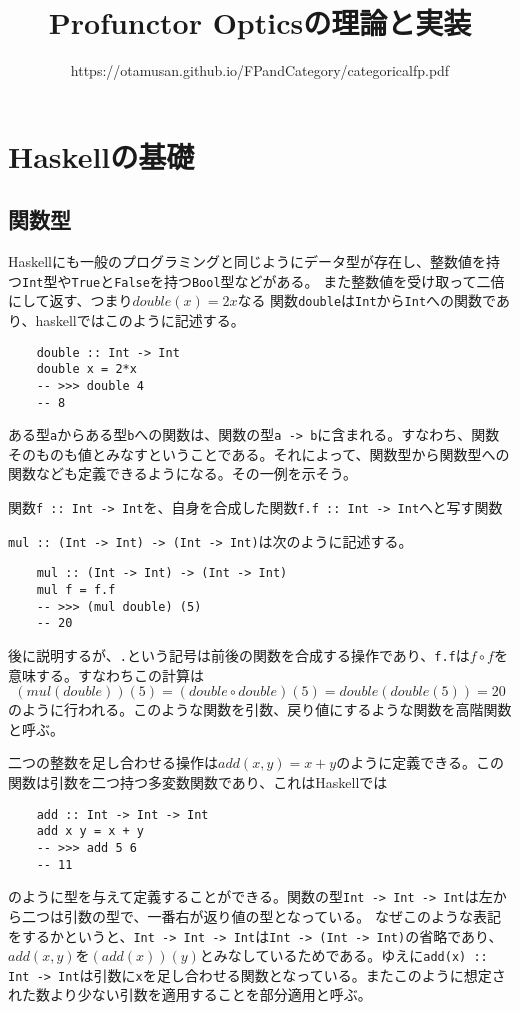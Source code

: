 \documentclass[uplatex,dvipdfmx]{jsarticle}
\newcommand{\pr}[1]{\colorbox[rgb]{0.9,0.9,0.9}{\lstinline{#1}}}
\newcommand{\functype}[2]{\pr{#1 -> #2}}
\newcommand{\fpmor}[3]{\pr{#1 :: #2 -> #3}}
\begin{document}
  \title{Profunctor Opticsの理論と実装}
  \author{https://otamusan.github.io/FPandCategory/categoricalfp.pdf}
  \maketitle
	\tableofcontents
  \pagebreak
  \section{Haskellの基礎}
  \subsection{関数型}
  Haskellにも一般のプログラミングと同じようにデータ型が存在し、整数値を持つ\pr{Int}型や\pr{True}と\pr{False}を持つ\pr{Bool}型などがある。
  また整数値を受け取って二倍にして返す、つまり$double(x)=2x$なる
  関数\pr{double}は\pr{Int}から\pr{Int}への関数であり、haskellではこのように記述する。
  \begin{lstlisting}
    double :: Int -> Int
    double x = 2*x
    -- >>> double 4
    -- 8
  \end{lstlisting}
  ある型\pr{a}からある型\pr{b}への関数は、関数の型\functype{a}{b}に含まれる。すなわち、関数そのものも値とみなすということである。それによって、関数型から関数型への関数なども定義できるようになる。その一例を示そう。

  関数\fpmor{f}{Int}{Int}を、自身を合成した関数\fpmor{f.f}{Int}{Int}へと写す関数
  
  \fpmor{mul}{(Int -> Int)}{(Int -> Int)}は次のように記述する。
  \begin{lstlisting}
    mul :: (Int -> Int) -> (Int -> Int)
    mul f = f.f
    -- >>> (mul double) (5)
    -- 20
  \end{lstlisting}
  後に説明するが、\pr{.}という記号は前後の関数を合成する操作であり、\pr{f.f}は$f\circ f$を意味する。すなわちこの計算は
  \[(mul(double))(5)=(double \circ double)(5)=double(double(5))=20\]のように行われる。このような関数を引数、戻り値にするような関数を高階関数と呼ぶ。
  
  二つの整数を足し合わせる操作は$add(x,y)=x+y$のように定義できる。この関数は引数を二つ持つ多変数関数であり、これはHaskellでは
  \begin{lstlisting}
    add :: Int -> Int -> Int
    add x y = x + y
    -- >>> add 5 6
    -- 11
  \end{lstlisting}
  のように型を与えて定義することができる。関数の型\pr{Int -> Int -> Int}は左から二つは引数の型で、一番右が返り値の型となっている。
  なぜこのような表記をするかというと、\pr{Int -> Int -> Int}は\pr{Int -> (Int -> Int)}の省略であり、$add(x,y)$を$(add(x))(y)$とみなしているためである。ゆえに\fpmor{add(x)}{Int}{Int}は引数に\pr{x}を足し合わせる関数となっている。またこのように想定された数より少ない引数を適用することを部分適用と呼ぶ。
\end{document}
